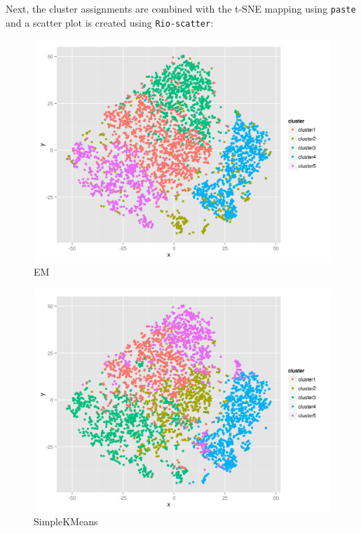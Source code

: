 \documentclass[
]{book}
\newenvironment{Shaded}{\begin{snugshade}}{\end{snugshade}}
\newcommand{\ExtensionTok}[1]{#1}
\newcommand{\NormalTok}[1]{#1}
\newcommand{\OperatorTok}[1]{\textcolor[rgb]{0.81,0.36,0.00}{\textbf{#1}}}
\newcommand{\StringTok}[1]{\textcolor[rgb]{0.31,0.60,0.02}{#1}}
\theoremstyle{definition}
\theoremstyle{definition}
\theoremstyle{definition}
\theoremstyle{remark}
\begin{document}
Next, the cluster assignments are combined with the t-SNE mapping using \texttt{paste} and a scatter plot is created using \texttt{Rio-scatter}:

\begin{Shaded}
\end{Shaded}

\begin{figure}

{\centering \includegraphics[width=32.81in]{images/ch09-wine-cluster-em} 

}

\caption{EM}\label{fig:unnamed-chunk-33}
\end{figure}

\begin{figure}

{\centering \includegraphics[width=32.81in]{images/ch09-wine-cluster-simplekmeans} 

}

\caption{SimpleKMeans}\label{fig:unnamed-chunk-34}
\end{figure}
\end{document}
